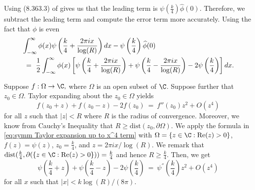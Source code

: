 \documentclass[11pt, reqno]{amsart}
\makeatletter
\renewenvironment{proof}[1][\proofname]{\par
  \vspace{-.7\topsep}%
  \pushQED{\qed}%
  \normalfont
  \topsep0pt \partopsep0pt %
  \trivlist
  \item[\hskip\labelsep
        \itshape
    #1\@addpunct{.}]\ignorespaces
}{%
  \popQED\endtrivlist\@endpefalse
  \addvspace{6pt plus 6pt} %
}
\theoremstyle{definition}
\theoremstyle{remark}
\numberwithin{equation}{section}
\renewcommand{\hat}{\widehat}
\newcommand{\del}{\partial}
\makeatother
\begin{document}
\begin{proof}
Using (8.363.3) of \cite{GradshteynRyzhik1965} gives us that the leading term is $\psi(\frac{k}{4})\hat\phi(0)$. Therefore, we subtract the leading term and compute the error term more accurately. 
Using the fact that $\phi$ is even
\begin{align}
    &\int_{-\infty}^\infty \phi(x)\psi\left(\frac{k}{4}+ \frac{2\pi i x}{\log(R)}\right) dx - \psi\left(\frac{k}{4}\right)\hat\phi(0)\notag\\ & \ = \
    \frac{1}{2}\int_{-\infty}^\infty \phi(x)\left[\psi\left(\frac{k}{4}+ \frac{2\pi i x}{\log(R)}\right) + \psi\left(\frac{k}{4}- \frac{2\pi i x}{\log(R)}\right) - 2\psi\left(\frac{k}{4}\right)\right]dx. \label{eq:goal 1 what we want di gamma expand}
\end{align}

Suppose $f:\Omega\to \C,$ where $\Omega$ is an open subset of $\C$. Suppose further that $z_0 \in \Omega$. Taylor expanding about the $z_0 \in \Omega$ yields
\begin{equation}\label{eq:symm Taylor expansion up to x^4 term}
    f(z_0+z) + f(z_0-z) - 2f(z_0) \ =\  f''(z_0)z^2 + O(z^4)
\end{equation} for all $z$ such that $|z|<R$ where $R$ is the radius of convergence. Moreover, we know from Cauchy's Inequality that $R \geq \text{dist}(z_0,\del\Omega)$. 
We apply the formula in \eqref{eq:symm Taylor expansion up to x^4 term} with $\Omega = \{z\in\C : \text{Re}(z) > 0\}$, $f(z) = \psi(z)$, $z_0 = \frac{k}{4}$, and $z = 2\pi ix/\log(R)$. We remark that $\text{dist}(\frac{k}{4},\del(\{z\in\C : \text{Re}(z) > 0\})) = \frac{k}{4}$ and hence $R\geq \frac{k}{4}$. Then, we get
\begin{equation}\label{eq:digamma taylor expand}
    \psi\left(\frac{k}{4} + z\right) +  \psi\left(\frac{k}{4} - z\right) - 2 \psi\left(\frac{k}{4}\right) \ =\  \psi^{''}\left(\frac{k}{4}\right) z^2 + O(z^4)
\end{equation} for all $x$ such that $|x|<k\log(R)/(8\pi)$.


\end{proof}
\end{document}
